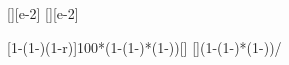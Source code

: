 [\percent][e-2]
[\percent][e-2]

[1-\left(1-\eta\right)\left(1-r\right)]{100*(1-(1-\etAX)*(1-\rabX))}[\percent]
[]{(1-(1-\etAX)*(1-\rabX))/\etAX}
